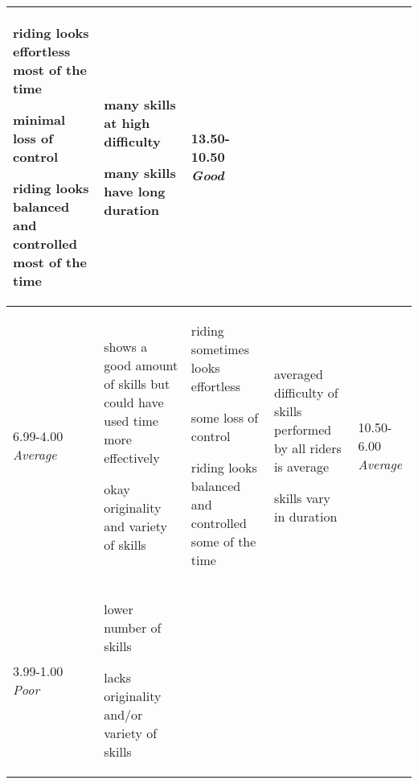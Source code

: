 \begin{minipage}{\textwidth}
\begin{longtable}{|p{1.5cm}|p{5cm}|p{5cm}|p{5cm}|p{1.5cm}|}
\begin{judging_items}%
\item riding looks effortless most of the time
\item minimal loss of control
\item riding looks balanced and controlled most of the time
\end{judging_items} &

\begin{judging_items}%
\item many skills at high difficulty
\item many skills have long duration
\end{judging_items} &

13.50-10.50 \newline
\emph{Good} \\
\hline

6.99-4.00 \newline
\emph{Average} &

\begin{judging_items}%
\item shows a good amount of skills but could have used time more effectively
\item okay originality and variety of skills
\end{judging_items} &

\begin{judging_items}%
\item riding sometimes looks effortless
\item some loss of control
\item riding looks balanced and controlled some of the time
\end{judging_items} &

\begin{judging_items}%
\item averaged difficulty of skills performed by all riders is average
\item skills vary in duration
\end{judging_items} &

10.50-6.00 \newline
\emph{Average} \\
\hline

3.99-1.00 \newline
\emph{Poor} &

\begin{judging_items}%
\item lower number of skills
\item lacks originality and/or variety of skills
\end{judging_items} &


\end{longtable}
\end{minipage}
